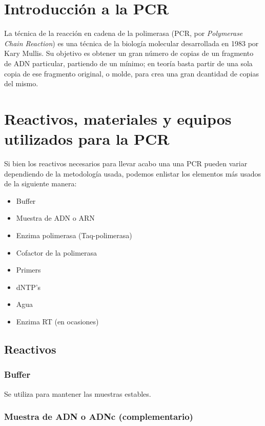 \section{Introducción a la PCR}

La técnica de la reacción en cadena de la polimerasa (PCR, por \textit{Polymerase Chain Reaction}) es una técnica de la biología molecular desarrollada en 1983 por Kary Mullis. Su objetivo es obtener un gran número de copias de un fragmento de ADN particular, partiendo de un mínimo; en teoría basta partir de una sola copia de ese fragmento original, o molde, para crea una gran dcantidad de copias del mismo.

\section{Reactivos, materiales y equipos utilizados para la PCR}

Si bien los reactivos necesarios para llevar acabo una una PCR pueden variar dependiendo de la metodología usada,  podemos enlistar los elementos más usados de la siguiente manera:

\begin{itemize}
    \item Buffer
    \item Muestra de ADN o ARN
    \item Enzima polimerasa (Taq-polimerasa)
    \item Cofactor de la polimerasa
    \item Primers
    \item dNTP's
    \item Agua
    \item Enzima RT (en ocasiones)
\end{itemize}

\subsection{Reactivos}

\subsubsection{Buffer}
Se utiliza para mantener las muestras estables.

\subsubsection{Muestra de ADN o ADNc (complementario)}

